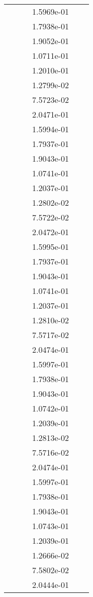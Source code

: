 \begin{xltabular}{\textwidth}{r|rS[table-format=1.3e+2]S[table-format=1.4e+2]S[table-format=1.4e+2]S[table-format=-1.5]}
&  &  & 1.5969e-01 & & \\
&  &  & 1.7938e-01 & & \\
&  &  & 1.9052e-01 & & \\
&  &  & 1.0711e-01 & & \\
&  &  & 1.2010e-01 & & \\
&  &  & 1.2799e-02 & & \\
&  &  & 7.5723e-02 & & \\
&  &  & 2.0471e-01 & & \\
&  &  & 1.5994e-01 & & \\
&  &  & 1.7937e-01 & & \\
&  &  & 1.9043e-01 & & \\
&  &  & 1.0741e-01 & & \\
&  &  & 1.2037e-01 & & \\
&  &  & 1.2802e-02 & & \\
&  &  & 7.5722e-02 & & \\
&  &  & 2.0472e-01 & & \\
&  &  & 1.5995e-01 & & \\
&  &  & 1.7937e-01 & & \\
&  &  & 1.9043e-01 & & \\
&  &  & 1.0741e-01 & & \\
&  &  & 1.2037e-01 & & \\
&  &  & 1.2810e-02 & & \\
&  &  & 7.5717e-02 & & \\
&  &  & 2.0474e-01 & & \\
&  &  & 1.5997e-01 & & \\
&  &  & 1.7938e-01 & & \\
&  &  & 1.9043e-01 & & \\
&  &  & 1.0742e-01 & & \\
&  &  & 1.2039e-01 & & \\
&  &  & 1.2813e-02 & & \\
&  &  & 7.5716e-02 & & \\
&  &  & 2.0474e-01 & & \\
&  &  & 1.5997e-01 & & \\
&  &  & 1.7938e-01 & & \\
&  &  & 1.9043e-01 & & \\
&  &  & 1.0743e-01 & & \\
&  &  & 1.2039e-01 & & \\
&  &  & 1.2666e-02 & & \\
&  &  & 7.5802e-02 & & \\
&  &  & 2.0444e-01 & & \\

\end{xltabular}
